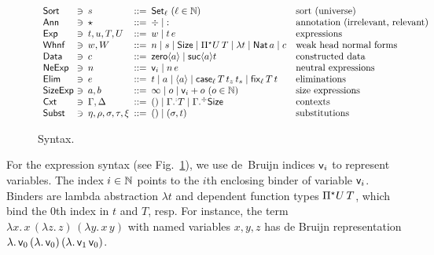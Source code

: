 \documentclass[acmsmall,screen]{acmart}\settopmatter{}
\begin{document}
\begin{figure}[htbp]
\centering
\hrulefill
\[
\begin{array}{l@{~}l@{~\,}l@{~\,}r@{~\,}l@{\quad}l}
\Sort & \ni & s
    & ::= & \Set[\ell] ~(\ell \in \NN)& \mbox{sort (universe)} \\
\Ann & \ni & \star & ::= & \erased \mid \noterased & \mbox{annotation (irrelevant, relevant)}\\
\Exp & \ni & t,u,T,U
    & ::= & w \mid t\,e & \mbox{expressions} \\
\Whnf & \ni & w, W
    & ::= & n \mid s \mid \Size \mid \epiT U T %
    \mid \lambda t%
    \mid \Nat a \mid c & \mbox{weak head normal forms} \\ %
\Data & \ni & c
   & ::= & \zero a \mid \suc a t & \mbox{constructed data} \\
\NeExp & \ni & n
    & ::= & \ind i \mid n \, e & \mbox{neutral expressions} \\
\Elim & \ni & e
    & ::= & t \mid a \mid \ann a \mid \case[\ell] T {t_z} {t_s} \mid \fix[\ell] T t & \mbox{eliminations} \\
\SizeExp & \ni & a,b & ::= & \infty \mid o \mid \ind i + o ~(o \in \NN) & \mbox{size expressions} \\
\Cxt & \ni & \Gamma, \Delta & ::= & \cempty \mid \erext[\noterased] \Gamma T \mid \erext \Gamma \Size
   & \mbox{contexts} \\
\Subst & \ni & \eta,\rho,\sigma,\tau,\xi & ::= & \sempty \mid (\sigma,t)
  & \mbox{substitutions} \\
\end{array}
\]
\hrulefill
\vspace{-2ex}
  \caption{Syntax.}
  \label{fig:syntax}
\end{figure}

For the expression syntax (see Fig.~\ref{fig:syntax}), we use
de~Bruijn \citeyearpar{deBruijn:nameless} indices $\mathsf{v}_{i}$ to
represent variables.  The index $i \in \mathbb{N}$ points to the $i$th
enclosing binder of variable $\mathsf{v}_{i}$.  Binders are lambda abstraction
$\lambda t$ and dependent function types $\Pi{}^{\mathord{\star}}U\, T$, which bind the
$0$th index in $t$ and $T$, resp.  For instance, the term
$\lambda x.\,x\,(\lambda z.\,z)\, (\lambda y.\,x\,y)$
with named variables $x,y,z$ has de Bruijn representation
$\lambda.\,\mathsf{v}_{0}\,(\lambda.\, \mathsf{v}_{0})\,(\lambda.\,\mathsf{v}_{1}\,\mathsf{v}_{0})$.
\end{document}
